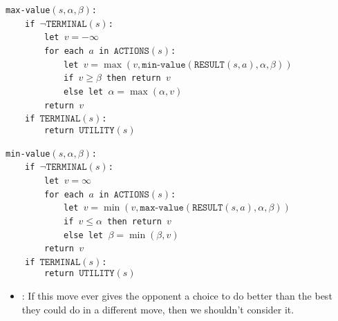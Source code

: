 \documentclass[twocolumn,english]{article}
\let\emph\relax
\begin{document}
 
\begin{table}[H]
\raggedright{}\texttt{\small{}{}max-value$\left(s,\alpha,\beta\right)$:}{\small{}~}\\
{\small{} }\texttt{\small{}{}$\qquad$if $\lnot\texttt{TERMINAL}\left(s\right)$:}{\small{}~}\\
{\small{} }\texttt{\small{}{}$\qquad\qquad$let $v=-\infty$}{\small{}~}\\
{\small{} }\texttt{\small{}{}$\qquad\qquad$for each $a$ in $\texttt{ACTIONS}\left(s\right)$:}{\small{}~}\\
{\small{} }\texttt{\small{}{}$\qquad\qquad\qquad$let $v=\max\left(v,\texttt{min-value}\left(\texttt{RESULT}\left(s,a\right),\alpha,\beta\right)\right)$}{\small{}~}\\
{\small{} }\texttt{\small{}{}$\qquad\qquad\qquad$if $v\geq\beta$
then return $v$}{\small{}~}\\
{\small{} }\texttt{\small{}{}$\qquad\qquad\qquad$else let $\alpha=\max\left(\alpha,v\right)$}{\small{}~}\\
{\small{} }\texttt{\small{}{}$\qquad\qquad$return $v$}{\small{}~}\\
{\small{} }\texttt{\small{}{}$\qquad$if $\texttt{TERMINAL}\left(s\right)$:}{\small{}~}\\
{\small{} }\texttt{\small{}{}$\qquad\qquad$return $\texttt{UTILITY}\left(s\right)$}{\small{} }
\end{table}

 
\begin{table}[H]
\raggedright{}\texttt{\small{}{}min-value$\left(s,\alpha,\beta\right)$:}{\small{}~}\\
{\small{} }\texttt{\small{}{}$\qquad$if $\lnot\texttt{TERMINAL}\left(s\right)$:}{\small{}~}\\
{\small{} }\texttt{\small{}{}$\qquad\qquad$let $v=\infty$}{\small{}~}\\
{\small{} }\texttt{\small{}{}$\qquad\qquad$for each $a$ in $\texttt{ACTIONS}\left(s\right)$:}{\small{}~}\\
{\small{} }\texttt{\small{}{}$\qquad\qquad\qquad$let $v=\min\left(v,\texttt{max-value}\left(\texttt{RESULT}\left(s,a\right),\alpha,\beta\right)\right)$}{\small{}~}\\
{\small{} }\texttt{\small{}{}$\qquad\qquad\qquad$if $v\leq\alpha$
then return $v$}{\small{}~}\\
{\small{} }\texttt{\small{}{}$\qquad\qquad\qquad$else let $\beta=\min\left(\beta,v\right)$}{\small{}~}\\
{\small{} }\texttt{\small{}{}$\qquad\qquad$return $v$}{\small{}~}\\
{\small{} }\texttt{\small{}{}$\qquad$if $\texttt{TERMINAL}\left(s\right)$:}{\small{}~}\\
{\small{} }\texttt{\small{}{}$\qquad\qquad$return $\texttt{UTILITY}\left(s\right)$}{\small{} }
\end{table}
\begin{itemize}
\item \emph{Key idea}: If this move ever gives the opponent a choice to
do better than the best they could do in a different move, then we
shouldn't consider it. 
\end{itemize}
\end{document}
